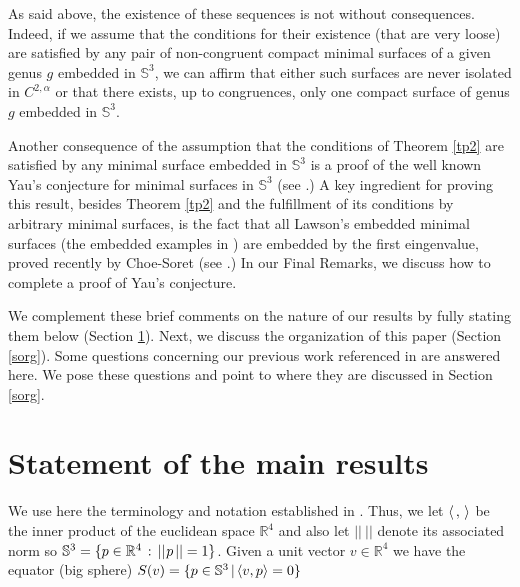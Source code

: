 \documentclass{article}
\def\S3{{\mathbb S^3}}
\begin{document}
 
As said above, the existence of these sequences is not without consequences. Indeed, if we assume that the conditions for their existence (that are very loose) are satisfied by any pair of non-congruent compact minimal surfaces of a given genus $g$ embedded in $\S3$, we can affirm that either such surfaces are never isolated in $C^{2,\alpha}$ or that there exists, up to congruences, only one compact surface of genus $g$ embedded in $\S3$.

Another consequence of  the assumption that the conditions of Theorem \ref{tp2} are satisfied by any minimal surface embedded in $\S3$ is a proof of the well known Yau's conjecture for minimal surfaces in $\S3$ (see \cite[prob. 100]{y}.) A key ingredient for proving this result, besides Theorem \ref{tp2} and the fulfillment of its conditions by arbitrary minimal surfaces, is the fact that all Lawson's embedded minimal surfaces (the embedded examples in \cite{l1}) are embedded by the first eingenvalue, proved recently by Choe-Soret (see \cite{cs}.) In our Final Remarks, we discuss how to complete a proof of Yau's conjecture.


We complement  these brief comments on the nature of our results by fully stating them below (Section \ref{sst}). Next, we discuss the  organization of this paper (Section \ref{sorg}). Some questions concerning our previous work referenced  in \cite{p1} are answered here. We pose these questions and point  to where they are discussed in Section \ref{sorg}.

\section{Statement of the main results} \label{sst}

We use here the terminology and notation established in \cite[Section 2]{p1}. Thus, we let $\langle\hspace{.02in},\hspace{.02in}\rangle$ be the inner product of the euclidean space $\mathbb R^4$ and also let $||\ ||$ denote its associated norm so $\S3=\{p\in\mathbb R^4\hspace{.02in}:\hspace{.02in}||\hspace{.01in}p\hspace{.02in}||=1\}$. Given a unit vector $v\in \mathbb R^4$ we have the equator (big sphere) $S(v)=\{p\in \S3 \hspace{.02in}|\hspace{.02in}\langle v,p\rangle=0\}$
\end{document}
